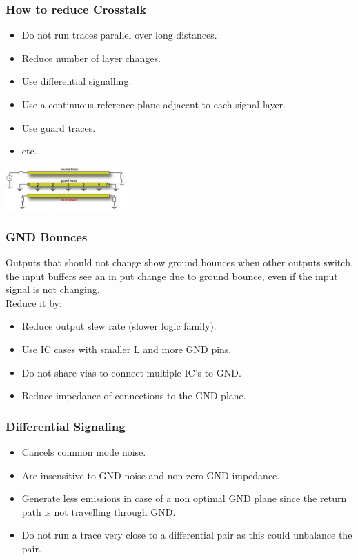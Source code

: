 		\subsubsection{How to reduce Crosstalk}
				\begin{itemize}
					\setlength{\itemsep}{-4pt}
					\item Do not run traces parallel over long distances. 
					\item Reduce number of layer changes. 
					\item Use differential signalling.
					\item Use a continuous reference plane adjacent to each signal layer. 
					\item Use guard traces. 
					\item etc. 
				\end{itemize}
				\begin{center}\includegraphics[width=0.35\textwidth]{images/GuardTrace.png}\end{center} 		
				
		\subsubsection{GND Bounces}
			Outputs that should not change show ground bounces when other outputs switch, the input buffers see an in put change due to ground bounce, even if the input signal is not changing. \\
			Reduce it by: 
			\begin{itemize}
				\setlength{\itemsep}{-4pt}
				\item Reduce output slew rate (slower logic family).
				\item Use IC cases with smaller L and more GND pins. 
				\item Do not share vias to connect multiple IC's to GND. 
				\item Reduce impedance of connections to the GND plane. 
			\end{itemize}
			
		\subsubsection{Differential Signaling}
			\begin{itemize}
				\setlength{\itemsep}{-4pt}
				\item Cancels common mode noise. 
				\item Are insensitive to GND noise and non-zero GND impedance. 
				\item Generate less emissions in case of a non optimal GND plane since the return path is not travelling through GND. 
				\item Do not run a trace very close to a differential pair as this could unbalance the pair. 
			\end{itemize}
			
